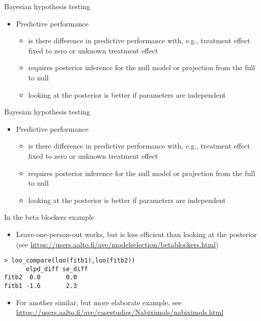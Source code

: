 \documentclass[english,t]{beamer}
\begin{document}
\begin{frame}[fragile]{Bayesian hypothesis testing}

  \begin{itemize}
  \item Predictive performance
    \begin{itemize}
    \item is there difference in predictive performance with, e.g.,
      treatment effect fixed to zero or unknown treatment effect
    \item requires posterior inference for the null model or
      projection from the full to null
    \item looking at the posterior is better if parameters are
      independent
    \end{itemize}
  \end{itemize}

\end{frame}

\begin{frame}{Bayesian hypothesis testing}

  \begin{itemize}
  \item Predictive performance
    \begin{itemize}
    \item is there difference in predictive performance with, e.g.,
      treatment effect fixed to zero or unknown treatment effect
    \item requires posterior inference for the null model or
      projection from the full to null
    \item looking at the posterior is better if parameters are
      independent
    \end{itemize}
  \end{itemize}

  In the beta blockers example
  \begin{itemize}
  \item Leave-one-person-out works, but is less efficient than looking
    at the posterior (see
    \url{https://users.aalto.fi/ave/modelselection/betablockers.html})
  \end{itemize}

\begin{verbatim}
> loo_compare(loo(fitb1),loo(fitb2))
      elpd_diff se_diff
fitb2  0.0       0.0   
fitb1 -1.6       2.3   
\end{verbatim}
  \pause
  \begin{itemize}
  \item For another similar, but more elaborate example, see \url{https://users.aalto.fi/ave/casestudies/Nabiximols/nabiximols.html}
  \end{itemize}
\end{frame}
\end{document}
